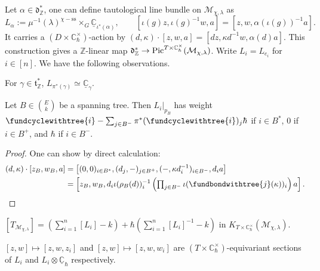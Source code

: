 \documentclass[b5paper]{article}
\newcommand{\MM}{\mathcal{M}}
\newcommand{\sstab}{\mathrm{ss}}
\newcommand{\Chbar}{\mathbb{C}^\times _\hbar}
\begin{document}
Let $\alpha\in \mathfrak{d}^*_\mathbb{Z}$, one can define tautological line bundle on $\MM_{\chi,\lambda}$ as 
\[
    L_\alpha:=\mu^{-1}(\lambda)^{\chi-\sstab}\times_G\underline{\mathbb{C}}_{\iota^*(\alpha)},\qquad 
\left[\iota(g)z,\iota(g)^{-1}w,a\right]=\left[z,w,\alpha(\iota(g))^{-1}a\right].
\]
It carries a $(D\times \Chbar)$-action by $(d,\kappa)\cdot [z,w,a]=\left[dz,\kappa d^{-1}w,\alpha(d)a\right]$.
This construction gives a $\mathbb{Z}$-linear map $\mathfrak{d}^*_\mathbb{Z}\rightarrow \textnormal{Pic}^{T\times \Chbar}(\MM_{\chi,\lambda})$. Write $L_i=L_{e_i}$ for $i\in [n]$.
We have the following observations.
\begin{proposition}[pps:]{}
    For $\gamma\in \mathfrak{t}^*_\mathbb{Z}$, $L_{\pi^*(\gamma)}\simeq \underline{\mathbb{C}}_{\gamma}$.
\end{proposition}

\begin{proposition}[pps:]{}
  Let $B\in \binom{E}{k}$ be a spanning tree. Then $\left.L_i\right|_{p_B}$ has weight $\fundcyclewithtree{i}-\sum_{j\in B^-}^{}\pi^*(\fundcyclewithtree{i})_j\hbar$ if $i\in B^*$, $0$ if $i\in B^+$, and $\hbar$ if $i\in B^-$.
      \begin{proof}
          One can show by direct calculation:
          \begin{alignat*}{1}
              (d,\kappa)\cdot [z_B,w_B,a]
              &=\left[(0,0)_{i\in B^*}, (d_j,-)_{j\in B^+}, (-,\kappa d_i^{-1})_{i\in B^-}, d_ia\right]\\
              &= \textstyle\left[z_B,w_B,d_i\iota(\rho_B(d))^{-1}_i\left(\prod_{j\in B^-}^{}\iota(\fundbondwithtree{j}(\kappa))_i\right)a\right].
          \end{alignat*}
      \end{proof}
\end{proposition}

\begin{corollary}[crl:]{}
    $[T_{\MM_{\chi,\lambda}}]=\left(\sum_{i=1}^{n}[L_i]-k\right)+\hbar\left(\sum_{i=1}^{n}[L_i]^{-1}-k\right)$ in $K_{T\times \Chbar}(\MM_{\chi,\lambda})$.
\end{corollary}

\begin{proposition}[pps:]{}
    $[z,w]\mapsto [z,w,z_i]$ and $[z,w]\mapsto [z,w,w_i]$ are $(T\times \Chbar)$-equivariant sections of $L_i$ and $L_i\otimes\underline{\mathbb{C}}_{\hbar}$ respectively.
\end{proposition}
\end{document}
